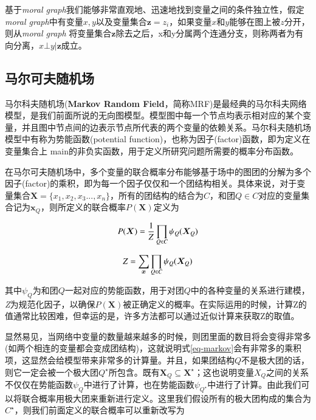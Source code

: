 基于\textit{moral graph}我们能够非常直观地、迅速地找到变量之间的条件独立性，假定\textit{moral graph}中有变量$x, y$以及变量集合$\bm{z} = {z_i}$，如果变量$x$和$y$能够在图上被$z$分开，则从\textit{moral graph} 将变量集合$\bm{z}$除去之后，x和y分属两个连通分支，则称两者为有向分离，$x \bot y | \bm{z}$成立。



\subsection{马尔可夫随机场}

马尔科夫随机场(\textbf{Markov Random Field}，简称MRF)是最经典的马尔科夫网络模型，是我们前面所说的无向图模型。模型图中每一个节点均表示相对应的某个变量，并且图中节点间的边表示节点所代表的两个变量的依赖关系。马尔科夫随机场模型中有称为势能函数(potential function)，也称为因子(factor)函数，即为定义在变量集合上 main的非负实函数，用于定义所研究问题所需要的概率分布函数。

在马尔可夫随机场中，多个变量的联合概率分布能够基于场中的图团的分解为多个因子(factor)的乘积，即为每一个因子仅仅和一个团结构相关。具体来说，对于变量集合$\bm{X} = \{x_1, x_2, x_3..., x_n\}$，所有的团结构的结合为$C$，和团$Q \in C$对应的变量集合记为$\bm{x}_Q$，则所定义的联合概率$P(\bm{X})$定义为

\begin{equation}
	P(\bm{X}) = \frac{1}{Z} \prod_{Q \in C} \psi_Q(\bm{X}_Q) \\
	\label{eq-markov}
\end{equation}

\begin{equation}
Z = \sum_{\bm{x}} \prod_{Q \in C} \psi_Q(\bm{X}_Q) \\
\end{equation}


其中$\psi_Q$为和团$Q$一起对应的势能函数，用于对团$Q$中的各种变量的关系进行建模，\textit{Z}为规范化因子，以确保$P(\bm{X})$被正确定义的概率。在实际运用的时候，计算Z的值通常比较困难，但幸运的是，许多方法都可以通过近似计算来获取Z的取值。

显然易见，当网络中变量的数量越来越多的时候，则团里面的数目将会变得非常多(如两个相连的变量都会变成团结构)，这就说明式\ref{eq-markov}会有非常多的乘积项，这显然会给模型带来非常多的计算量。并且，如果团结构$Q$不是极大团的话，则它一定会被一个极大团$Q^{\star}$所包含。既有$\bm{X}_Q \subseteq \bm{X}^{\star}$；这也说明变量$X_Q$之间的关系不仅仅在势能函数$\psi_Q$中进行了计算，也在势能函数$\psi_{Q^{\star}}$中进行了计算。由此我们可以将联合概率用极大团来重新进行定义。这里我们假设所有的极大团构成的集合为$C^{\star}$，则我们前面定义的联合概率可以重新改写为

